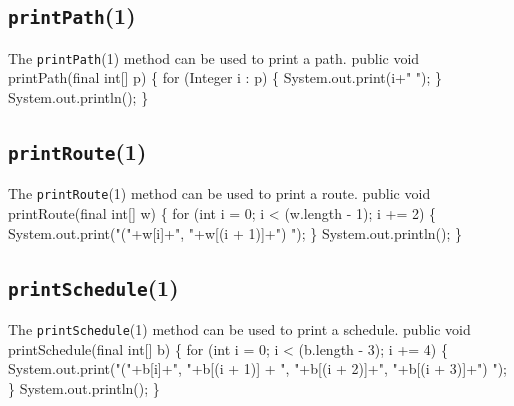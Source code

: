 \documentclass{article}
\def\nwendcode{\endtrivlist \endgroup}      %
\let\nwdocspar=\par
\begin{document}
\subsection{{\tt{}\protect{}printPath}(1)}
The {\tt{}\protect{}printPath}(1) method can be used to print a path.
\nwenddocs{}\endmoddef{}
public void printPath(final int[] p) \{
  for (Integer i : p) \{
    System.out.print(i+" ");
  \}
  System.out.println();
\}
\eatline
{}\nwendcode{}\nwdocspar
\subsection{{\tt{}\protect{}printRoute}(1)}
The {\tt{}\protect{}printRoute}(1) method can be used to print a route.
\nwenddocs{}\endmoddef{}
public void printRoute(final int[] w) \{
  for (int i = 0; i < (w.length - 1); i += 2) \{
    System.out.print("("+w[i]+", "+w[(i + 1)]+") ");
  \}
  System.out.println();
\}
\eatline
{}\nwendcode{}\nwdocspar
\subsection{{\tt{}\protect{}printSchedule}(1)}
The {\tt{}\protect{}printSchedule}(1) method can be used to print a schedule.
\nwenddocs{}\endmoddef{}
public void printSchedule(final int[] b) \{
  for (int i = 0; i < (b.length - 3); i += 4) \{
    System.out.print("("+b[i]+", "+b[(i + 1)]
      + ", "+b[(i + 2)]+", "+b[(i + 3)]+") ");
  \}
  System.out.println();
\}
\eatline
{}\nwendcode{}\nwdocspar
\end{document}
